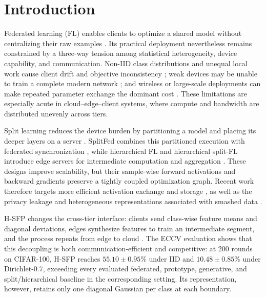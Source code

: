 \section{Introduction}\label{sec:intro}
Federated learning (FL) enables clients to optimize a shared model without centralizing their raw examples \cite{pmlr-v54-mcmahan17a}. Its practical deployment nevertheless remains constrained by a three-way tension among statistical heterogeneity, device capability, and communication. Non-IID class distributions and unequal local work cause client drift and objective inconsistency \cite{10660707,nguyen2026towards}; weak devices may be unable to train a complete modern network \cite{MAL-083,11180918}; and wireless or large-scale deployments can make repeated parameter exchange the dominant cost \cite{9084352,9760729,nguyen2022hcfl,nguyen2025federated}. These limitations are especially acute in cloud--edge--client systems, where compute and bandwidth are distributed unevenly across tiers.

Split learning reduces the device burden by partitioning a model and placing its deeper layers on a server \cite{GUPTA20181,vepakomma2019split}. SplitFed combines this partitioned execution with federated synchronization \cite{thapa2022splitfed}, while hierarchical FL and hierarchical split-FL introduce edge servers for intermediate computation and aggregation \cite{9148862,9488756,rana2022hierarchical,quan2023hiersfl,10980018}. These designs improve scalability, but their sample-wise forward activations and backward gradients preserve a tightly coupled optimization graph. Recent work therefore targets more efficient activation exchange and storage \cite{11091500,zhang2025amperecommunicationefficienthighaccuracysplit}, as well as the privacy leakage and heterogeneous representations associated with smashed data \cite{qiu2023evaluating,wang2025towards}.

H-SFP changes the cross-tier interface: clients send class-wise feature means and diagonal deviations, edges synthesize features to train an intermediate segment, and the process repeats from edge to cloud \cite{hsfp2026eccv}. The ECCV evaluation shows that this decoupling is both communication-efficient and competitive: at 200 rounds on CIFAR-100, H-SFP reaches $55.10\pm0.95\%$ under IID and $10.48\pm0.85\%$ under Dirichlet-$0.7$, exceeding every evaluated federated, prototype, generative, and split/hierarchical baseline in the corresponding setting. Its representation, however, retains only one diagonal Gaussian per class at each boundary.

